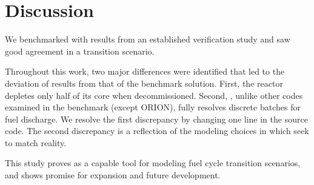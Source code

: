 \section{Discussion}

We benchmarked \Cyclus with results from an established
verification study and saw good agreement
in a transition scenario. 

Throughout this work, two major differences were identified
that led to the deviation
of \Cyclus results from that of the benchmark solution. First,
the \Cycamore reactor depletes only half of its core
when decommissioned. Second, \Cyclus, unlike other
codes examined in the benchmark (except ORION), fully resolves
discrete batches for fuel discharge.
We resolve the first discrepancy by changing one line in the source code. The 
second discrepancy is a reflection of the modeling choices in \Cyclus which 
seek to match reality.

This study proves \Cyclus as a capable tool for modeling
fuel cycle transition scenarios, and shows promise for
expansion and future development.
